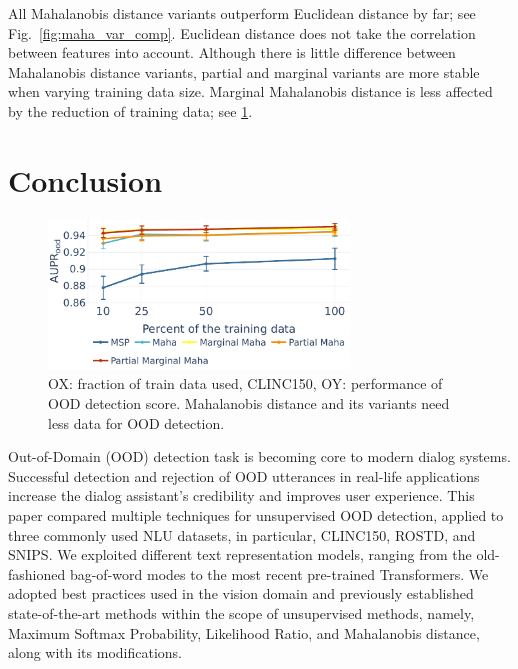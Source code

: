 \documentclass[letterpaper, final]{article} %
\begin{document}
All Mahalanobis distance variants outperform Euclidean distance by far; see Fig.~\ref{fig:maha_var_comp}. Euclidean distance does not take the correlation between features into account. Although there is little difference between Mahalanobis distance variants, partial and marginal variants are more stable when varying training data size.  Marginal Mahalanobis distance is less affected by the reduction of training data; see \ref{fig:dataset_size_var}.









\section{Conclusion}
%
\begin{figure}[t]
    \centering
    \includegraphics[width=8cm, keepaspectratio]{aupr_clinc_diff_sizes.pdf}
    \caption{OX: fraction of train data used, CLINC150, OY: performance of OOD detection score. Mahalanobis distance and its variants need less data for OOD detection.}
    \label{fig:dataset_size_var}
\end{figure}

Out-of-Domain (OOD) detection task is becoming core to modern dialog systems. Successful detection and rejection of OOD utterances in real-life applications increase the dialog assistant's credibility and improves user experience. This paper compared multiple techniques for unsupervised OOD detection, applied to three commonly used NLU datasets, in particular, CLINC150, ROSTD, and SNIPS. We exploited different text representation models, ranging from the old-fashioned bag-of-word modes to the most recent pre-trained Transformers. We adopted best practices used in the vision domain and previously established state-of-the-art methods within the scope of unsupervised methods, namely, Maximum Softmax Probability, Likelihood Ratio, and Mahalanobis distance, along with its modifications.
\end{document}
